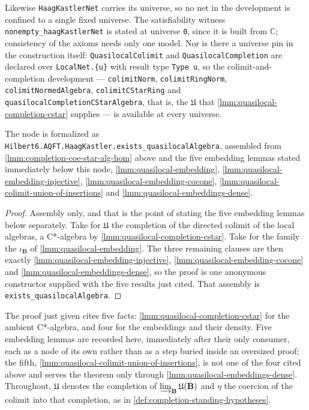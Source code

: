\begin{theorem}
    Likewise \texttt{HaagKastlerNet} carries its universe, so no net in the development is confined to a single fixed universe. The satisfiability witness \texttt{nonempty\_haagKastlerNet} is stated at universe \texttt{0}, since it is built from $\mathbb{C}$; consistency of the axioms needs only one model. Nor is there a universe pin in the construction itself: \texttt{QuasilocalColimit} and \texttt{QuasilocalCompletion} are declared over \texttt{LocalNet.\{u\}} with result type \texttt{Type u}, so the colimit-and-completion development --- \texttt{colimitNorm}, \texttt{colimitRingNorm}, \texttt{colimitNormedAlgebra}, \texttt{colimitCStarRing} and \texttt{quasilocalCompletionCStarAlgebra}, that is, the $\mathfrak{U}$ that \ref{lmm:quasilocal-completion-cstar} supplies --- is available at every universe.

    The node is formalized as \texttt{Hilbert6.AQFT.HaagKastler.exists\_quasilocalAlgebra}, assembled from \ref{lmm:completion-coe-star-alg-hom} above and the five embedding lemmas stated immediately below this node, \ref{lmm:quasilocal-embedding}, \ref{lmm:quasilocal-embedding-injective}, \ref{lmm:quasilocal-embedding-cocone}, \ref{lmm:quasilocal-colimit-union-of-insertions} and \ref{lmm:quasilocal-embeddings-dense}.
\end{theorem}
\begin{proof}
    \leanok
    Assembly only, and that is the point of stating the five embedding lemmas below separately. Take for $\mathfrak{U}$ the completion of the directed colimit of the local algebras, a C*-algebra by \ref{lmm:quasilocal-completion-cstar}. Take for the family the $\iota_{\mathbf{B}}$ of \ref{lmm:quasilocal-embedding}. The three remaining clauses are then exactly \ref{lmm:quasilocal-embedding-injective}, \ref{lmm:quasilocal-embedding-cocone} and \ref{lmm:quasilocal-embeddings-dense}, so the proof is one anonymous constructor supplied with the five results just cited. That assembly is \texttt{exists\_quasilocalAlgebra}.
\end{proof}

The proof just given cites five facts: \ref{lmm:quasilocal-completion-cstar} for the ambient C*-algebra, and four for the embeddings and their density. Five embedding lemmas are recorded here, immediately after their only consumer, each as a node of its own rather than as a step buried inside an oversized proof; the fifth, \ref{lmm:quasilocal-colimit-union-of-insertions}, is not one of the four cited above and serves the theorem only through \ref{lmm:quasilocal-embeddings-dense}. Throughout, $\mathfrak{U}$ denotes the completion of $\varinjlim_{\mathbf{B}} \mathfrak{U}(\mathbf{B})$ and $\eta$ the coercion of the colimit into that completion, as in \ref{def:completion-standing-hypotheses}.

